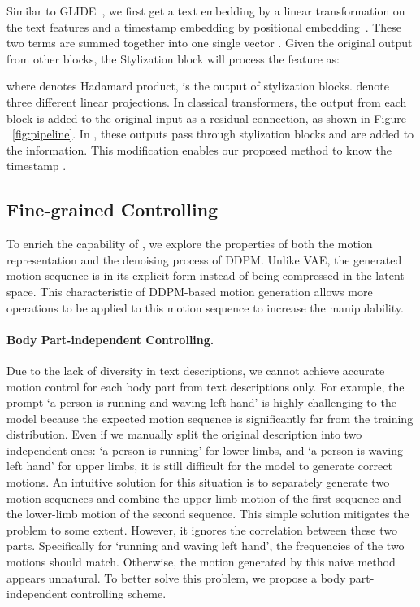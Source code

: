 Similar to GLIDE~\citep{nichol2021glide}, we first get a text embedding  by a linear transformation on the text features and a timestamp embedding  by positional embedding~\citep{vaswani2017attention}. These two terms are summed together into one single vector . Given the original output  from other blocks, the Stylization block will process the feature as:

where  denotes Hadamard product,  is the output of stylization blocks.  denote three different linear projections. In classical transformers, the output from each block is added to the original input as a residual connection, as shown in Figure ~\ref{fig:pipeline}. In \name, these outputs pass through stylization blocks and are added to the information. This modification enables our proposed method to know the timestamp . 

\subsection{Fine-grained Controlling}\label{sec3_5}

To enrich the capability of \name, we explore the properties of both the motion representation and the denoising process of DDPM. Unlike VAE, the generated motion sequence is in its explicit form instead of being compressed in the latent space. This characteristic of DDPM-based motion generation allows more operations to be applied to this motion sequence to increase the manipulability.

\paragraph{Body Part-independent Controlling.}
Due to the lack of diversity in text descriptions, we cannot achieve accurate motion control for each body part from text descriptions only. For example, the prompt `a person is running and waving left hand' is highly challenging to the model because the expected motion sequence is significantly far from the training distribution. Even if we manually split the original description into two independent ones: `a person is running' for lower limbs, and `a person is waving left hand' for upper limbs, it is still difficult for the model to generate correct motions. An intuitive solution for this situation is to separately generate two motion sequences and combine the upper-limb motion of the first sequence and the lower-limb motion of the second sequence. This simple solution mitigates the problem to some extent. However, it ignores the correlation between these two parts. Specifically for `running and waving left hand', the frequencies of the two motions should match. Otherwise, the motion generated by this naive method appears unnatural. To better solve this problem, we propose a body part-independent controlling scheme.

